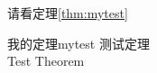 \documentclass[cn]{../../templates/elegantbook/elegantbook}
\begin{document}
请看定理\ref{thm:mytest}

\begin{theorem}{我的定理}{mytest}
测试定理 \\
Test Theorem
\end{theorem}
\end{document}
